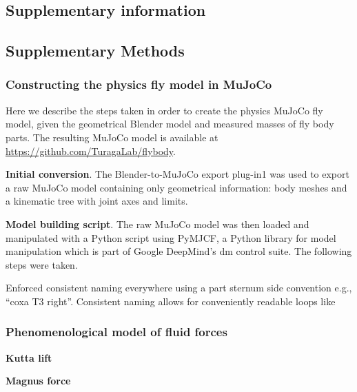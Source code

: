 \documentclass[sn-mathphys-num]{sn-jnl}%
\theoremstyle{thmstyleone}%
\theoremstyle{thmstyletwo}%
\theoremstyle{thmstylethree}%
\begin{document}
\begin{appendices}
	
	
\section{Supplementary information} \label{secInfo}

\subsection{Supplementary Methods}

\subsubsection{Constructing the physics fly model in MuJoCo}

Here we describe the steps taken in order to create the physics MuJoCo fly model, given the geometrical Blender model and measured masses of fly body parts. 
The resulting MuJoCo model is available at \href{https://github.com/TuragaLab/flybody}{https://github.com/TuragaLab/flybody}.


\textbf{Initial conversion}. The Blender-to-MuJoCo export plug-in\cite{tunyasuvunakool2020dm_control}1 was used to export a raw MuJoCo model containing only geometrical information: 
body meshes and a kinematic tree with joint axes and limits.


\textbf{Model building script}. 
The raw MuJoCo model was then loaded and manipulated with a Python script using PyMJCF, a Python library for model manipulation which is part of Google DeepMind’s dm control suite\cite{tunyasuvunakool2020dm_control}. 
The following steps were taken.


Enforced consistent naming everywhere using a part sternum side convention e.g., “coxa T3 right”. 
Consistent naming allows for conveniently readable loops like


\subsubsection{Phenomenological model of fluid forces}


\textbf{Kutta lift}

\textbf{Magnus force}



\end{appendices}
\end{document}
